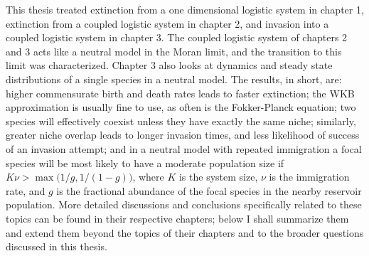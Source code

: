 This thesis treated extinction from a one dimensional logistic system in chapter 1, extinction from a coupled logistic system in chapter 2, and invasion into a coupled logistic system in chapter 3. 
The coupled logistic system of chapters 2 and 3 acts like a neutral model in the Moran limit, and the transition to this limit was characterized. 
Chapter 3 also looks at dynamics and steady state distributions of a single species in a neutral model. %
The results, in short, are: higher commensurate birth and death rates leads to faster extinction; the WKB approximation is usually fine to use, as often is the Fokker-Planck equation; two species will effectively coexist unless they have exactly the same niche; similarly, greater niche overlap leads to longer invasion times, and less likelihood of success of an invasion attempt; and in a neutral model with repeated immigration a focal species will be most likely to have a moderate population size if $K\nu > \max\big(1/g,1/(1-g)\big)$, where $K$ is the system size, $\nu$ is the immigration rate, and $g$ is the fractional abundance of the focal species in the nearby reservoir population. 
More detailed discussions and conclusions specifically related to these topics can be found in their respective chapters; below I shall summarize them and extend them beyond the topics of their chapters and to the broader questions discussed in this thesis. 

